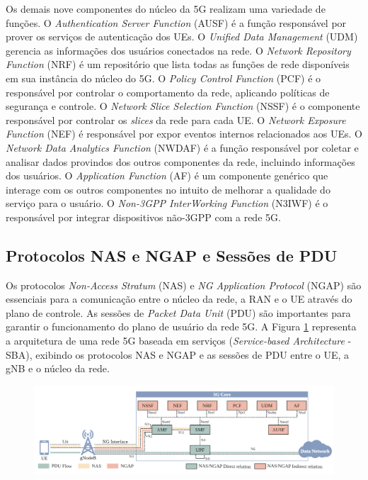 Os demais nove componentes do núcleo da 5G realizam uma variedade de funções.
O \textit{Authentication Server Function} (AUSF) é a função responsável por prover os serviços de autenticação dos UEs.
O \textit{Unified Data Management} (UDM) gerencia as informações dos usuários conectados na rede.
O \textit{Network Repository Function} (NRF) é um repositório que lista todas as funções de rede disponíveis em sua instância do núcleo do 5G.
O \textit{Policy Control Function} (PCF) é o responsável por controlar o comportamento da rede, aplicando políticas de segurança e controle.
O \textit{Network Slice Selection Function} (NSSF) é o componente responsável por controlar os \textit{slices} da rede para cada UE.
O \textit{Network Exposure Function} (NEF) é responsável por expor eventos internos relacionados aos UEs.
O \textit{Network Data Analytics Function} (NWDAF) é a função responsável por coletar e analisar dados provindos dos outros componentes da rede, incluindo informações dos usuários.
O \textit{Application Function} (AF) é um componente genérico que interage com os outros componentes no intuito de melhorar a qualidade do serviço para o usuário.
O \textit{Non-3GPP InterWorking Function} (N3IWF) é o responsável por integrar dispositivos não-3GPP com a rede 5G.

\subsection{Protocolos NAS e NGAP e Sessões de PDU}

Os protocolos \textit{Non-Access Stratum} (NAS) e \textit{NG Application Protocol} (NGAP) são essenciais para a comunicação entre o núcleo da rede, a RAN e o UE através do plano de controle.
As sessões de \textit{Packet Data Unit} (PDU) são importantes para garantir o funcionamento do plano de usuário da rede 5G.
A Figura \ref{fig:5Gprotocols} representa a arquitetura de uma rede 5G baseada em serviços (\textit{Service-based Architecture} - SBA), exibindo os protocolos NAS e NGAP e as sessões de PDU entre o UE, a gNB e o núcleo da rede.

\begin{figure}[!ht]
    \centering
    \includegraphics[width=1\textwidth]{TG2/Chapters/Background/Figures/Background-5GSystemProtocols.png}
    \label{fig:5Gprotocols}
\end{figure}

